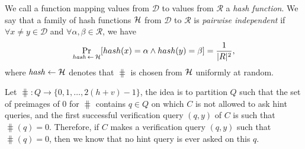 %
We call a function mapping values from $\mathcal{D}$ to values from $\mathcal{R}$ a \textit{hash function}.
We say that a family of hash functions $\mathcal{H}$ from $\mathcal{D}$ to $\mathcal{R}$ is \textit{pairwise independent}
if $\forall x \neq y \in \mathcal{D}$ and $\forall \alpha, \beta \in \mathcal{R}$, we have
\begin{align}
\underset{\hash \la0 \cH}{\Pr}[hash(x) = \alpha \land hash(y) = \beta] = \frac{1}{|R|^2},
\end{align}
where $\operatorname{\mathit{hash}} \leftarrow \mathcal{H}$ denotes that $\hash$ is chosen from $\mathcal{H}$ uniformly at random.

Let $\hash:Q\rightarrow\{0,1,\dots, 2(h+v)-1\}$, the idea is to partition $Q$ such that the set of preimages
of $0$ for $\hash$ contains $q \in Q$ on which $C$ is not allowed to ask hint queries,
and the first successful verification query $(q,y)$ of $C$ is such that $\hash(q) = 0$.
Therefore, if $C$ makes a verification query $(q,y)$ such that $\hash(q) = 0$, then we know that no hint query is ever asked on this $q$.

